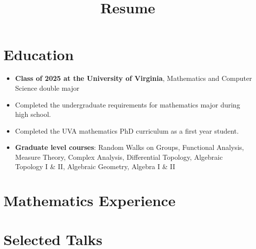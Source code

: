 \documentclass[11pt,letterpaper,sans]{moderncv}
\title{Resume}
\begin{document}
\makecvtitle %
\vspace*{-3.5em}


%

\section{Education}

\begin{itemize}
  \item \textbf{Class of 2025 at the University of Virginia}, Mathematics and Computer Science double major
  \item Completed the undergraduate requirements for mathematics major during high school.
  \item Completed the UVA mathematics PhD curriculum as a first year student.
  \item \textbf{Graduate level courses}: Random Walks on Groups, Functional Analysis, Measure Theory, Complex Analysis, Differential Topology, Algebraic Topology I \& II, Algebraic Geometry, Algebra I \& II
\end{itemize}



\section{Mathematics Experience}



\section{Selected Talks}
\end{document}
